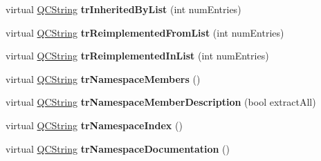 \begin{DoxyCompactItemize}
\item 
\hypertarget{class_translator_swedish_ae3d0b686686bbad5d0d0c00dd659d05c}{virtual \hyperlink{class_q_c_string}{Q\-C\-String} {\bfseries tr\-Inherited\-By\-List} (int num\-Entries)}\label{class_translator_swedish_ae3d0b686686bbad5d0d0c00dd659d05c}

\item 
\hypertarget{class_translator_swedish_a3e195179c98c6c78494949095f1c367d}{virtual \hyperlink{class_q_c_string}{Q\-C\-String} {\bfseries tr\-Reimplemented\-From\-List} (int num\-Entries)}\label{class_translator_swedish_a3e195179c98c6c78494949095f1c367d}

\item 
\hypertarget{class_translator_swedish_ae31066cc2f6b74862f2f86e16aeb4a55}{virtual \hyperlink{class_q_c_string}{Q\-C\-String} {\bfseries tr\-Reimplemented\-In\-List} (int num\-Entries)}\label{class_translator_swedish_ae31066cc2f6b74862f2f86e16aeb4a55}

\item 
\hypertarget{class_translator_swedish_a493f2f99fac12e30e02ee39d5cea79cb}{virtual \hyperlink{class_q_c_string}{Q\-C\-String} {\bfseries tr\-Namespace\-Members} ()}\label{class_translator_swedish_a493f2f99fac12e30e02ee39d5cea79cb}

\item 
\hypertarget{class_translator_swedish_abe422143a54da2cad8ae364b45d70eb8}{virtual \hyperlink{class_q_c_string}{Q\-C\-String} {\bfseries tr\-Namespace\-Member\-Description} (bool extract\-All)}\label{class_translator_swedish_abe422143a54da2cad8ae364b45d70eb8}

\item 
\hypertarget{class_translator_swedish_a5b154bcb92d74bf36e005d6709709f71}{virtual \hyperlink{class_q_c_string}{Q\-C\-String} {\bfseries tr\-Namespace\-Index} ()}\label{class_translator_swedish_a5b154bcb92d74bf36e005d6709709f71}

\item 
\hypertarget{class_translator_swedish_adace66ae174642555c6277121c712568}{virtual \hyperlink{class_q_c_string}{Q\-C\-String} {\bfseries tr\-Namespace\-Documentation} ()}\label{class_translator_swedish_adace66ae174642555c6277121c712568}


\end{DoxyCompactItemize}
